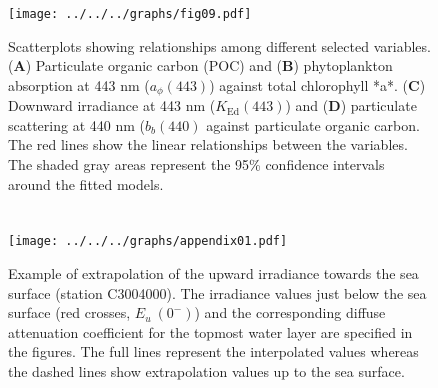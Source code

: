 \documentclass[essd, manuscript]{copernicus}
\begin{document}
\begin{figure}[t]
    \texttt{[image: ../../../graphs/fig09.pdf]}
    \caption{Scatterplots showing relationships among different selected variables. (\textbf{A}) Particulate organic carbon (POC) and (\textbf{B}) phytoplankton absorption at 443 nm ($a_{\phi}(443)$) against total chlorophyll *a*. (\textbf{C}) Downward irradiance at 443 nm ($K_{\text{Ed}}(443)$) and (\textbf{D}) particulate scattering at 440 nm ($b_{b}(440)$ against particulate organic carbon. The red lines show the linear relationships between the variables. The shaded gray areas represent the 95\% confidence intervals around the fitted models.}
\end{figure}




\appendix
\section{}    %

\subsection{}     %


\noappendix       %




\appendixfigures  %

\begin{figure}[htp]
    \texttt{[image: ../../../graphs/appendix01.pdf]}
    \caption{Example of extrapolation of the upward irradiance towards the sea surface (station C3004000). The irradiance values just below the sea surface (red crosses, $E_u~(0^{-})$) and the corresponding diffuse attenuation coefficient for the topmost water layer are specified in the figures. The full lines represent the interpolated values whereas the dashed lines show extrapolation values up to the sea surface.}
\end{figure}
\end{document}
